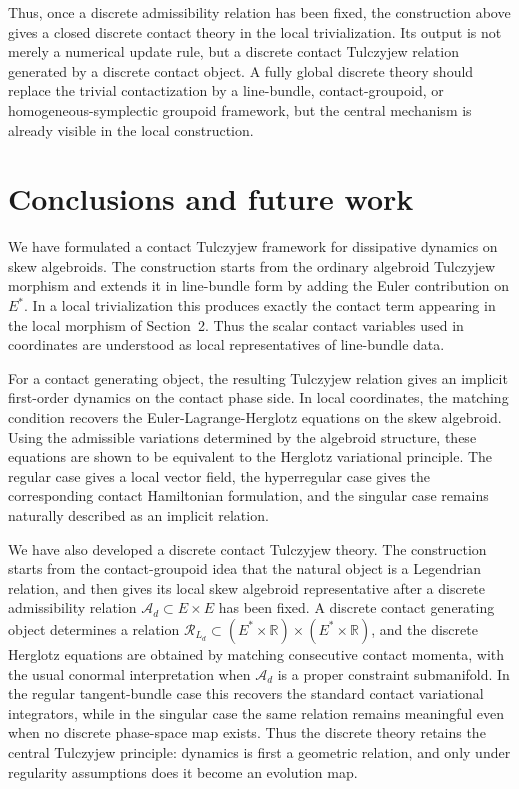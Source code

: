 \documentclass[11pt]{article}
\newcommand{\R}{\mathbb{R}}
\newcommand{\mc}[1]{\mathcal{#1}}
\begin{document}
Thus, once a discrete admissibility relation has been fixed, the construction
above gives a closed discrete contact theory in the local trivialization. Its
output is not merely a numerical update rule, but a discrete contact Tulczyjew
relation generated by a discrete contact object. A fully global discrete theory
should replace the trivial contactization by a line-bundle, contact-groupoid, or
homogeneous-symplectic groupoid framework, but the central mechanism is already
visible in the local construction.

\section{Conclusions and future work}\label{conc}

We have formulated a contact Tulczyjew framework for dissipative dynamics on skew
algebroids. The construction starts from the ordinary algebroid Tulczyjew morphism
and extends it in line-bundle form by adding the Euler contribution on \(E^*\). In a
local trivialization this produces exactly the contact term appearing in the local
morphism of Section~2. Thus the scalar contact variables used in coordinates are
understood as local representatives of line-bundle data.

For a contact generating object, the resulting Tulczyjew relation gives an implicit
first-order dynamics on the contact phase side. In local coordinates, the matching
condition recovers the Euler-Lagrange-Herglotz equations on the skew algebroid.
Using the admissible variations determined by the algebroid structure, these
equations are shown to be equivalent to the Herglotz variational principle. The
regular case gives a local vector field, the hyperregular case gives the
corresponding contact Hamiltonian formulation, and the singular case remains
naturally described as an implicit relation.

We have also developed a discrete contact Tulczyjew theory. The construction
starts from the contact-groupoid idea that the natural object is a Legendrian
relation, and then gives its local skew algebroid representative after a
discrete admissibility relation \(\mc A_d\subset E\times E\) has been fixed. A
discrete contact generating object determines a relation
\(\mc R_{L_d}\subset (E^*\times\R)\times(E^*\times\R)\), and the discrete
Herglotz equations are obtained by matching consecutive contact momenta, with
the usual conormal interpretation when \(\mc A_d\) is a proper constraint
submanifold. In the regular tangent-bundle case this recovers the standard
contact variational integrators, while in the singular case the same relation
remains meaningful even when no discrete phase-space map exists. Thus the
discrete theory retains the central Tulczyjew principle: dynamics is first a
geometric relation, and only under regularity assumptions does it become an
evolution map.
\end{document}
